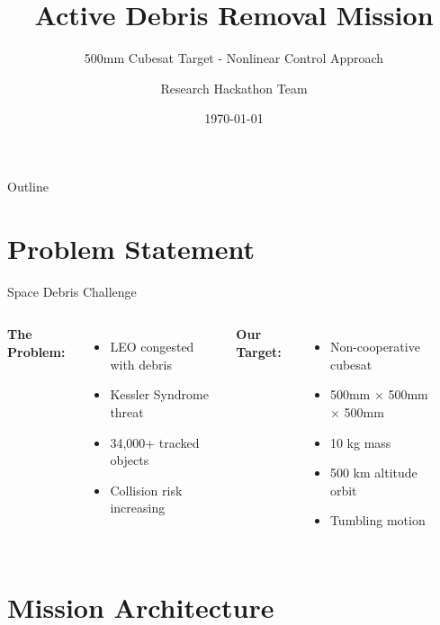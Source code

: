 \documentclass[aspectratio=169]{beamer}
\title[ADR Mission]{Active Debris Removal Mission}
\subtitle{500mm Cubesat Target - Nonlinear Control Approach}
\author{Research Hackathon Team}
\institute{IIT Kanpur - Institute Research Symposium 2025}
\date{\today}
\begin{document}
\begin{frame}
\titlepage
\end{frame}

\begin{frame}{Outline}
\tableofcontents
\end{frame}

\section{Problem Statement}

\begin{frame}{Space Debris Challenge}
\begin{columns}
\textbf{The Problem:}
\begin{itemize}
    \item LEO congested with debris
    \item Kessler Syndrome threat
    \item 34,000+ tracked objects
    \item Collision risk increasing
\end{itemize}

\vspace{1em}
\textbf{Our Target:}
\begin{itemize}
    \item Non-cooperative cubesat
    \item 500mm × 500mm × 500mm
    \item 10 kg mass
    \item 500 km altitude orbit
    \item Tumbling motion
\end{itemize}

\begin{center}
\end{center}
\end{columns}
\end{frame}

\section{Mission Architecture}
\end{document}
